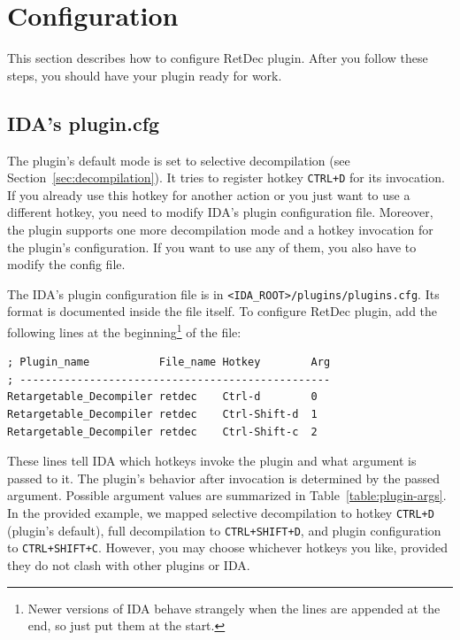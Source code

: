 \documentclass[pdftex, a4paper,12pt, oneside, svgnames]{article}
\begin{document}
\section{Configuration}
\label{sec:configuration}
This section describes how to configure RetDec plugin. After you follow these steps, you should have your plugin ready for work.

\subsection{IDA's plugin.cfg}
\label{sec:config:plugin-cfg}
The plugin's default mode is set to selective decompilation (see Section~\ref{sec:decompilation}). It tries to register hotkey \texttt{CTRL+D} for its invocation. If you already use this hotkey for another action or you just want to use a different hotkey, you need to modify IDA's plugin configuration file. Moreover, the plugin supports one more decompilation mode and a hotkey invocation for the plugin's configuration. If you want to use any of them, you also have to modify the config file.

The IDA's plugin configuration file is in \texttt{<IDA\_ROOT>/plugins/plugins.cfg}. Its format is documented inside the file itself. To configure RetDec plugin, add the following lines at the beginning\footnote{Newer versions of IDA behave strangely when the lines are appended at the end, so just put them at the start.} of the file:
\begin{verbatim}
; Plugin_name           File_name Hotkey        Arg
; -------------------------------------------------
Retargetable_Decompiler retdec    Ctrl-d        0
Retargetable_Decompiler retdec    Ctrl-Shift-d  1
Retargetable_Decompiler retdec    Ctrl-Shift-c  2
\end{verbatim}
These lines tell IDA which hotkeys invoke the plugin and what argument is passed to it. The plugin's behavior after invocation is determined by the passed argument. Possible argument values are summarized in Table~\ref{table:plugin-args}. In the provided example, we mapped selective decompilation to hotkey \texttt{CTRL+D} (plugin's default), full decompilation to \texttt{CTRL+SHIFT+D}, and plugin configuration to \texttt{CTRL+SHIFT+C}. However, you may choose whichever hotkeys you like, provided they do not clash with other plugins or IDA.
\end{document}
